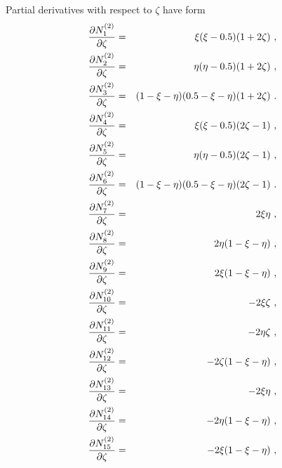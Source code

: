 Partial derivatives with respect to $\zeta$ have form
\begin{eqnarray}
\label{bfquadweddz1}
\ppd{N_1^{(2)}}{\zeta} &=& \xi(\xi-0.5)(1 + 2\zeta)\ ,
\\
\label{bfquadweddz2}
\ppd{N_2^{(2)}}{\zeta} &=& \eta(\eta-0.5)(1 + 2\zeta)\ ,
\\
\label{bfquadweddz3}
\ppd{N_3^{(2)}}{\zeta} &=& (1 - \xi - \eta)(0.5-\xi-\eta)(1 + 2\zeta)\ .
\\
\label{bfquadweddz4}
\ppd{N_4^{(2)}}{\zeta} &=& \xi(\xi-0.5)(2\zeta - 1)\ ,
\\
\label{bfquadweddz5}
\ppd{N_5^{(2)}}{\zeta} &=& \eta(\eta-0.5)(2\zeta - 1)\ ,
\\
\label{bfquadweddz6}
\ppd{N_6^{(2)}}{\zeta} &=& (1 - \xi - \eta)(0.5-\xi-\eta)(2\zeta - 1)\ .
\\
\label{bfquadweddz7}
\ppd{N_7^{(2)}}{\zeta} &=& 2 \xi \eta\ ,
\\
\label{bfquadweddz8}
\ppd{N_8^{(2)}}{\zeta} &=& 2 \eta (1 - \xi - \eta)\ ,
\\
\label{bfquadweddz9}
\ppd{N_9^{(2)}}{\zeta} &=& 2 \xi (1 - \xi - \eta)\ ,
\\
\label{bfquadweddz10}
\ppd{N_{10}^{(2)}}{\zeta} &=& -2 \xi \zeta\ ,
\\
\label{bfquadweddz11}
\ppd{N_{11}^{(2)}}{\zeta} &=& -2 \eta \zeta\ ,
\\
\label{bfquadweddz12}
\ppd{N_{12}^{(2)}}{\zeta} &=& -2 \zeta (1 - \xi - \eta)\ ,
\\
\label{bfquadweddz13}
\ppd{N_{13}^{(2)}}{\zeta} &=& -2 \xi \eta \ ,
\\
\label{bfquadweddz14}
\ppd{N_{14}^{(2)}}{\zeta} &=& -2 \eta (1 - \xi - \eta)\ ,
\\
\label{bfquadweddz15}
\ppd{N_{15}^{(2)}}{\zeta} &=& -2 \xi (1 - \xi - \eta)\ ,
\end{eqnarray}


